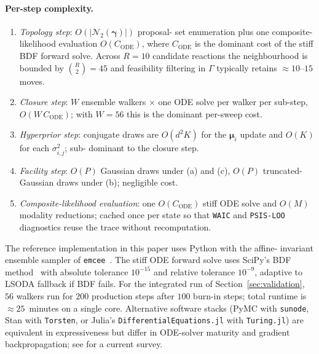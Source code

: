 \documentclass[12pt]{article}
\theoremstyle{plain}
\theoremstyle{definition}
\theoremstyle{remark}
\begin{document}
\paragraph{Per-step complexity.}
\begin{enumerate}
\item \emph{Topology step}: $O(|\mathcal{N}_2(\boldsymbol\gamma)|)$ proposal-
      set enumeration plus one composite-likelihood evaluation
      $O(C_{\mathrm{ODE}})$, where $C_{\mathrm{ODE}}$ is the dominant cost of
      the stiff BDF forward solve.  Across $R=10$ candidate reactions the
      neighbourhood is bounded by $\binom{R}{2}=45$ and feasibility
      filtering in $\Gamma$ typically retains $\approx 10$--$15$ moves.
\item \emph{Closure step}: $W$ ensemble walkers $\times$ one ODE solve
      per walker per sub-step, $O(W\,C_{\mathrm{ODE}})$; with $W=56$ this
      is the dominant per-sweep cost.
\item \emph{Hyperprior step}: conjugate draws are $O(d^2 K)$ for the
      $\boldsymbol\mu_i$ update and $O(K)$ for each $\sigma_{i,j}^2$; sub-
      dominant to the closure step.
\item \emph{Facility step}: $O(P)$ Gaussian draws under (a) and (c),
      $O(P)$ truncated-Gaussian draws under (b); negligible cost.
\item \emph{Composite-likelihood evaluation}: one $O(C_{\mathrm{ODE}})$
      stiff ODE solve and $O(M)$ modality reductions; cached once per
      state so that \texttt{WAIC} and \texttt{PSIS-LOO} diagnostics reuse
      the trace without recomputation.
\end{enumerate}

The reference implementation in this paper uses Python with the affine-
invariant ensemble sampler of \texttt{emcee}~\citep{ForemanMackey2013}.
The stiff ODE forward solve uses SciPy's BDF method~\citep{Hindmarsh2005}
with absolute tolerance $10^{-15}$ and relative tolerance $10^{-9}$,
adaptive to LSODA fallback if BDF fails.  For the integrated run of
Section~\ref{sec:validation}, $56$ walkers run for $200$ production steps
after $100$ burn-in steps; total runtime is $\approx 25$~minutes on a
single core.  Alternative software stacks (PyMC with \texttt{sunode},
Stan with \texttt{Torsten}, or Julia's \texttt{DifferentialEquations.jl}
with \texttt{Turing.jl}) are equivalent in expressiveness but differ in
ODE-solver maturity and gradient backpropagation; see
\citet{SciML2024} for a current survey.

\end{document}
